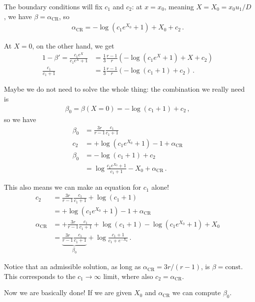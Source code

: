 \documentclass[main.tex]{subfiles}
\begin{document}
\begin{extracontent}
The boundary conditions will fix \(c_1 \) and \(c_2 \): 
at \(x = x_0 \), meaning \(X= X_0 = x_0 u_1 / D \), we have \(\beta = \alpha _{\text{CR}}\), so 
%
\begin{align}
\alpha _{\text{CR}} = - \log (c_1 e^{X_0}  + 1) + X_0  + c_2
\,.
\end{align}

At \(X =0 \), on the other hand, we get 
%
\begin{align}
1 - \beta ' = \frac{c_1 e^X}{c_1 e^X + 1} &= \frac{1}{3} \frac{r-1}{r} \left( - \log \left( c_1 e^X + 1\right) + X + c_2  \right)  \\
\frac{c_1 }{c_1 + 1} &= \frac{1}{3} \frac{r-1}{r} \left( - \log (c_1 + 1) + c_2  \right)
\,.
\end{align}

Maybe we do not need to solve the whole thing: the combination we really need is 
%
\begin{align}
\beta_0 = \beta (X = 0) = - \log (c_1 + 1) + c_2 
\,,
\end{align}
%
so we have 
%
\begin{align}
\beta_0 &= \frac{3r}{r-1} \frac{c_1 }{c_1 + 1}  \\
c_2 &= + \log (c_1 e^{X_0} + 1) - 1 + \alpha _{\text{CR}} \\
\beta_0 &= - \log (c_1 + 1 ) + c_2  \\
&= \log \frac{c_1 e^{X_0} + 1}{c_1 + 1} - X_0  + \alpha _{\text{CR}}
\,.
\end{align}

This also means we can make an equation for \(c_1 \) alone! 
%
\begin{align}
c_2 &= \frac{3r}{r-1} \frac{c_1}{c_1 + 1} + \log(c_1 + 1)  \\
&= + \log (c_1 e^{X_0} + 1) - 1 + \alpha _{\text{CR}}  \\
\alpha _{\text{CR}} &= + \frac{3r}{r-1} \frac{c_1}{c_1 + 1} + \log(c_1 + 1) - \log (c_1 e^{X_0} + 1) + X_0   \\
&= \underbrace{\frac{3r}{r-1} \frac{c_1}{c_1 + 1}}_{\beta_0 } + \log \frac{c_1 + 1}{c_1 + e^{-X_0 }}
\,.
\end{align}

Notice that an admissible solution, as long as \(\alpha _{\text{CR}} = 3r/(r-1)\), is \(\beta = \text{const}\). 
This corresponds to the \(c_1 \to \infty\) limit, where also \(c_2 = \alpha _{\text{CR}}\).

Now we are basically done! If we are given \(X_0 \) and \(\alpha _{\text{CR}}\) we can compute \(\beta_0\). 
\end{extracontent}
\end{document}

